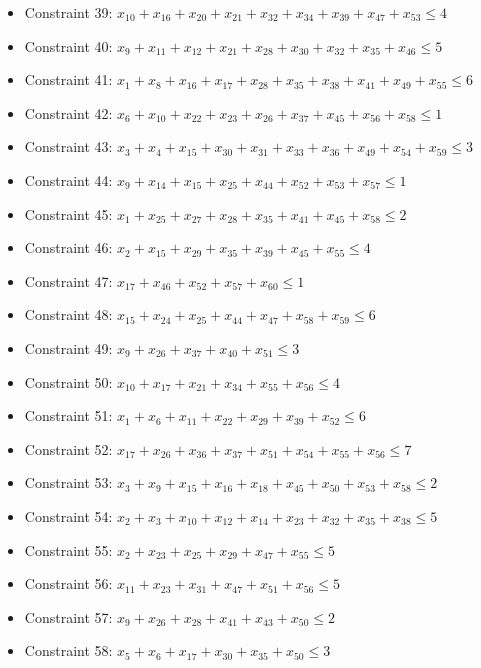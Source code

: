 \documentclass[11pt]{article}
\begin{document}
\begin{itemize}
\item Constraint 39: $x_{10} + x_{16} + x_{20} + x_{21} + x_{32} + x_{34} + x_{39} + x_{47} + x_{53} \le 4$
\item Constraint 40: $x_{9} + x_{11} + x_{12} + x_{21} + x_{28} + x_{30} + x_{32} + x_{35} + x_{46} \le 5$
\item Constraint 41: $x_{1} + x_{8} + x_{16} + x_{17} + x_{28} + x_{35} + x_{38} + x_{41} + x_{49} + x_{55} \le 6$
\item Constraint 42: $x_{6} + x_{10} + x_{22} + x_{23} + x_{26} + x_{37} + x_{45} + x_{56} + x_{58} \le 1$
\item Constraint 43: $x_{3} + x_{4} + x_{15} + x_{30} + x_{31} + x_{33} + x_{36} + x_{49} + x_{54} + x_{59} \le 3$
\item Constraint 44: $x_{9} + x_{14} + x_{15} + x_{25} + x_{44} + x_{52} + x_{53} + x_{57} \le 1$
\item Constraint 45: $x_{1} + x_{25} + x_{27} + x_{28} + x_{35} + x_{41} + x_{45} + x_{58} \le 2$
\item Constraint 46: $x_{2} + x_{15} + x_{29} + x_{35} + x_{39} + x_{45} + x_{55} \le 4$
\item Constraint 47: $x_{17} + x_{46} + x_{52} + x_{57} + x_{60} \le 1$
\item Constraint 48: $x_{15} + x_{24} + x_{25} + x_{44} + x_{47} + x_{58} + x_{59} \le 6$
\item Constraint 49: $x_{9} + x_{26} + x_{37} + x_{40} + x_{51} \le 3$
\item Constraint 50: $x_{10} + x_{17} + x_{21} + x_{34} + x_{55} + x_{56} \le 4$
\item Constraint 51: $x_{1} + x_{6} + x_{11} + x_{22} + x_{29} + x_{39} + x_{52} \le 6$
\item Constraint 52: $x_{17} + x_{26} + x_{36} + x_{37} + x_{51} + x_{54} + x_{55} + x_{56} \le 7$
\item Constraint 53: $x_{3} + x_{9} + x_{15} + x_{16} + x_{18} + x_{45} + x_{50} + x_{53} + x_{58} \le 2$
\item Constraint 54: $x_{2} + x_{3} + x_{10} + x_{12} + x_{14} + x_{23} + x_{32} + x_{35} + x_{38} \le 5$
\item Constraint 55: $x_{2} + x_{23} + x_{25} + x_{29} + x_{47} + x_{55} \le 5$
\item Constraint 56: $x_{11} + x_{23} + x_{31} + x_{47} + x_{51} + x_{56} \le 5$
\item Constraint 57: $x_{9} + x_{26} + x_{28} + x_{41} + x_{43} + x_{50} \le 2$
\item Constraint 58: $x_{5} + x_{6} + x_{17} + x_{30} + x_{35} + x_{50} \le 3$

\end{itemize}
\end{document}
